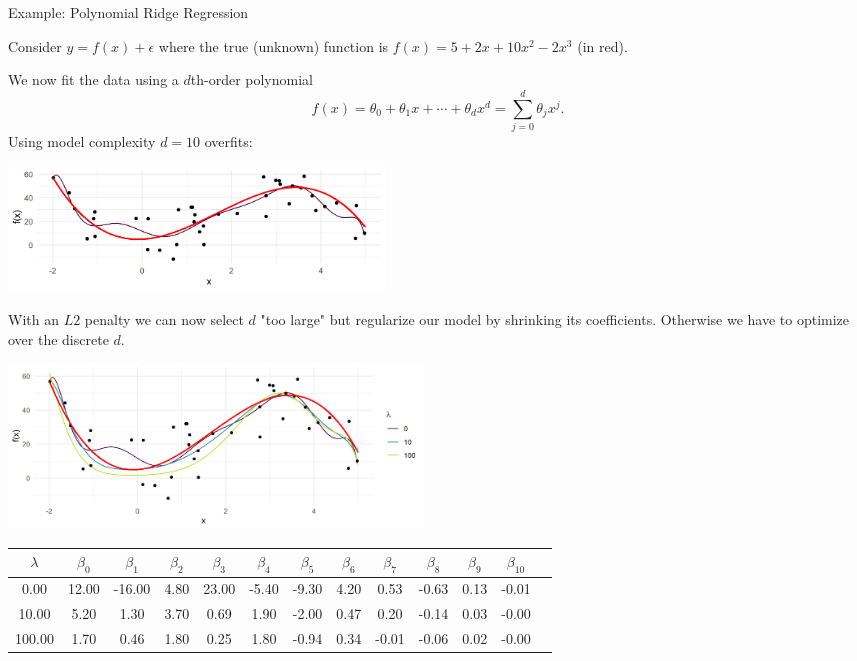 \documentclass[11pt,compress,t,notes=noshow, xcolor=table]{beamer}
\begin{document}
\begin{vbframe}{Example: Polynomial Ridge Regression}

Consider $y=f(x)+\epsilon$ where the true (unknown) function is \(f(x) = 5 + 2x +10x^2 - 2x^3\) (in red).

\lz

We now fit the data using a \(d\)th-order polynomial
\[ f(x) = \theta_0 + \theta_1 x + \cdots + \theta_d x^d = \sum_{j = 0}^{d} \theta_j x^j\text{.} \]
Using model complexity $d = 10$ overfits:

\begin{center}
\includegraphics[width = 10cm ]{figure/poly_ridge_1.png} \\
\end{center}

\framebreak

With an $L2$ penalty we can now select $d$ "too large" but regularize our model by shrinking its coefficients. Otherwise we have to optimize over the discrete $d$.

\vfill

\begin{center}
\includegraphics[width = 11cm ]{figure/poly_ridge_2.png} \\
\end{center}


\begin{center}
\tiny
\begin{tabular}{ c| c c c c c c c c c c c c}
 $\lambda$ & $\beta_0$ & $\beta_1$ & $\beta_2$ & $\beta_3$ & $\beta_4$ & $\beta_5$ & $\beta_6$ & $\beta_7$ & $\beta_8$ & $\beta_9$ & $\beta_{10}$ \\ 
 \hline
 0.00 & 12.00 & -16.00 & 4.80 & 23.00 & -5.40 & -9.30 & 4.20 & 0.53 & -0.63 & 0.13 & -0.01 \\  
 10.00 & 5.20 &1.30 & 3.70 & 0.69 & 1.90 & -2.00 & 0.47 & 0.20 & -0.14 & 0.03 & -0.00 \\ 
 100.00 & 1.70 & 0.46 & 1.80 & 0.25 & 1.80 & -0.94 & 0.34 & -0.01 & -0.06 & 0.02 & -0.00
\end{tabular}
\end{center}


\end{vbframe}
\end{document}
